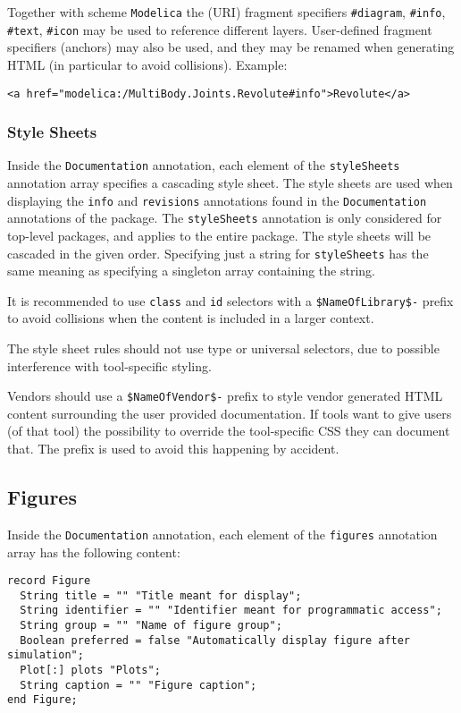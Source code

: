 Together with scheme \lstinline!Modelica! the (URI) fragment specifiers \lstinline!#diagram!, \lstinline!#info!, \lstinline!#text!, \lstinline!#icon! may be used to reference different layers.
User-defined fragment specifiers (anchors) may also be used, and they may be renamed when generating HTML (in particular to avoid collisions).
Example:
\begin{lstlisting}[language=modelica]
<a href="modelica:/MultiBody.Joints.Revolute#info">Revolute</a>
\end{lstlisting}

\subsubsection{Style Sheets}\label{style-sheets}

Inside the \lstinline!Documentation! annotation, each element of the \lstinline!styleSheets! annotation array specifies a cascading style sheet.
The style sheets are used when displaying the \lstinline!info! and \lstinline!revisions! annotations found in the \lstinline!Documentation! annotations of the package.
The \lstinline!styleSheets! annotation is only considered for top-level packages, and applies to the entire package.
The style sheets will be cascaded in the given order.
Specifying just a string for \lstinline!styleSheets! has the same meaning as specifying a singleton array containing the string.
\begin{nonnormative}
It is recommended to use \lstinline[language=CSS]!class! and \lstinline[language=CSS]!id! selectors with a \lstinline[language=CSS]!$NameOfLibrary$-! prefix to avoid collisions when the content is included in a larger context.
\end{nonnormative}
The style sheet rules should not use type or universal selectors, due to possible interference with tool-specific styling.

Vendors should use a \lstinline[language=CSS]!$NameOfVendor$-! prefix to style vendor generated HTML content surrounding the user provided documentation.
If tools want to give users (of that tool) the possibility to override the tool-specific CSS they can document that.
The prefix is used to avoid this happening by accident.

\subsection{Figures}\label{annotations-for-figures}\label{figures}

Inside the \lstinline!Documentation! annotation, each element of the \lstinline!figures! annotation array has the following content:
\begin{lstlisting}[language=modelica]
record Figure
  String title = "" "Title meant for display";
  String identifier = "" "Identifier meant for programmatic access";
  String group = "" "Name of figure group";
  Boolean preferred = false "Automatically display figure after simulation";
  Plot[:] plots "Plots";
  String caption = "" "Figure caption";
end Figure;
\end{lstlisting}

